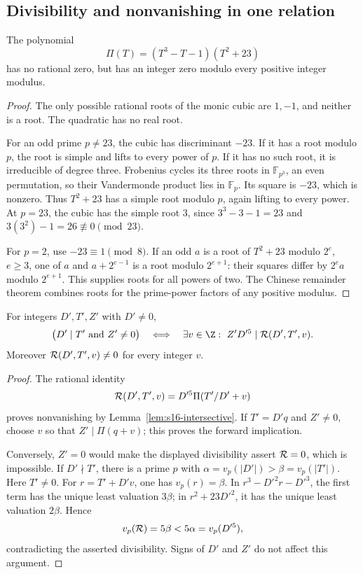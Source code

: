 \subsection{Divisibility and nonvanishing in one relation}

\begin{lemma}\label{lem:s16-intersective}
The polynomial
\[
 \Pi(T)=(T^3-T-1)(T^2+23)
\]
has no rational zero, but has an integer zero modulo every positive
integer modulus.
\end{lemma}
\begin{proof}
The only possible rational roots of the monic cubic are \(1,-1\),
and neither is a root.  The quadratic has no real root.

For an odd prime \(p\neq23\), the cubic has discriminant \(-23\).
If it has a root modulo \(p\), the root is simple and lifts to every
power of \(p\).
If it has no such root, it is irreducible of degree three.
Frobenius cycles its three roots in \(\mathbb F_{p^3}\), an even
permutation, so their Vandermonde product lies in \(\mathbb F_p\).
Its square is \(-23\), which is nonzero.  Thus \(T^2+23\) has a
simple root modulo \(p\), again lifting to every power.
At \(p=23\), the cubic has the simple root \(3\), since
\(3^3-3-1=23\) and \(3(3^2)-1=26\not\equiv0\pmod{23}\).

For \(p=2\), use \(-23\equiv1\pmod8\).
If an odd \(a\) is a root of \(T^2+23\) modulo \(2^e\), \(e\geq3\),
one of \(a\) and \(a+2^{e-1}\) is a root modulo \(2^{e+1}\):
their squares differ by \(2^ea\) modulo \(2^{e+1}\).
This supplies roots for all powers of two.
The Chinese remainder theorem combines roots for the prime-power
factors of any positive modulus.
\end{proof}

\begin{lemma}\label{lem:s16-merger}
For integers \(D',T',Z'\) with \(D'\neq0\),
\begin{equation}
 \big(D'\mid T'\ \hbox{and}\ Z'\neq0\big)
 \quad\Longleftrightarrow\quad
 \exists v\in\Z:\ Z'D'^5\mid{\cal R}(D',T',v).
 \label{eq:s16-merger}
\end{equation}
Moreover \({\cal R}(D',T',v)\neq0\) for every integer \(v\).
\end{lemma}
\begin{proof}
The rational identity
\[
 {\cal R}(D',T',v)=D'^5\Pi(T'/D'+v)
\]
proves nonvanishing by Lemma~\ref{lem:s16-intersective}.
If \(T'=D'q\) and \(Z'\neq0\), choose \(v\) so that
\(Z'\mid\Pi(q+v)\); this proves the forward implication.

Conversely, \(Z'=0\) would make the displayed divisibility assert
\({\cal R}=0\), which is impossible.
If \(D'\nmid T'\), there is a prime \(p\) with
\(\alpha=v_p(|D'|)>\beta=v_p(|T'|)\).
Here \(T'\neq0\).
For \(r=T'+D'v\), one has \(v_p(r)=\beta\).
In \(r^3-D'^2r-D'^3\), the first term has the unique least valuation
\(3\beta\); in \(r^2+23D'^2\), it has the unique least valuation
\(2\beta\).  Hence
\[
 v_p({\cal R})=5\beta<5\alpha=v_p(D'^5),
\]
contradicting the asserted divisibility.  Signs of \(D'\) and \(Z'\)
do not affect this argument.
\end{proof}

